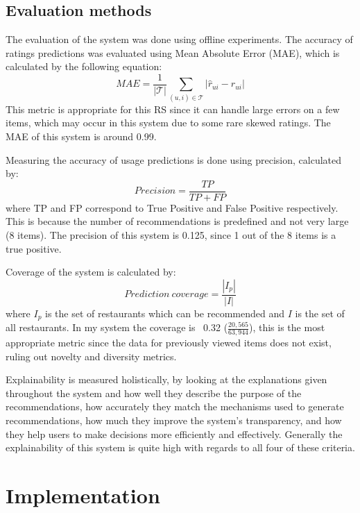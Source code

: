 \documentclass[conference]{IEEEtran}
\begin{document}
\subsection{Evaluation methods}
The evaluation of the system was done using offline experiments. 
The accuracy of ratings predictions was evaluated using Mean Absolute Error (MAE), which is calculated by the 
following equation:
\begin{equation}
    MAE = \frac{1}{|\mathcal{T}|} \sum_{(u,i)\in{\mathcal{T}}} {|\widehat{r}_{ui} - r_{ui}|}
\end{equation}
This metric is appropriate for this RS since it can handle large errors on a few items, which may occur in this system 
due to some rare skewed ratings. 
The MAE of this system is around 0.99. 

Measuring the accuracy of usage predictions is done using precision, calculated by: 
\begin{equation}
    Precision = \frac{TP}{TP+FP}
\end{equation}
where TP and FP correspond to True Positive and False Positive respectively. 
This is because the number of recommendations is predefined and not very large (8 items). 
The precision of this system is 0.125, since 1 out of the 8 items is a true positive. 

Coverage of the system is calculated by:
\begin{equation}
    Prediction\ coverage = \frac{|I_p|}{|I|}
\end{equation} 
where $I_p$ is the set of restaurants which can be recommended and $I$ is the set of all restaurants. 
In my system the coverage is ~0.32 ($\frac{20,565}{63,944}$), this is the most appropriate metric since 
the data for previously viewed items does not exist, ruling out novelty and diversity metrics. 

Explainability is measured holistically, by looking at the explanations given throughout the system and how 
well they describe the purpose of the recommendations, how accurately they match the mechanisms used to 
generate recommendations, how much they improve the system's transparency, and how they help users to make decisions 
more efficiently and effectively. 
Generally the explainability of this system is quite high with regards to all four of these criteria. 

\section{Implementation}
\end{document}
